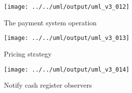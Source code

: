 \documentclass[a4paper]{scrreprt}
\begin{document}
\begin{figure}[H]
    \begin{center}
        \texttt{[image: ../../uml/output/uml\_v3\_012]}
        \caption{The payment system operation}
        \label{fig:pay}
    \end{center}
\end{figure}

\begin{figure}[H]
    \begin{center}
        \texttt{[image: ../../uml/output/uml\_v3\_013]}
        \caption{Pricing strategy}
        \label{fig:pricing}
    \end{center}
\end{figure}

\begin{figure}[H]
    \begin{center}
        \texttt{[image: ../../uml/output/uml\_v3\_014]}
        \caption{Notify cash register observers}
        \label{fig:notify-cashregister-observer}
    \end{center}
\end{figure}

\listoflistings %
\printbibliography
\end{document}

